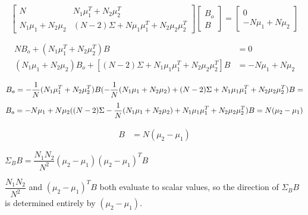 \documentclass[12pt]{report}
\begin{document}
\begin{equation}
    \begin{bmatrix}
        N & N_1 \mu_1^T + N_2 \mu_2^T  \\
        N_1 \mu_1 + N_2 \mu_2 & (N-2) \Sigma + N \mu_1 \mu_1^T + N_2 \mu_2 \mu_2^T
    \end{bmatrix}
    \begin{bmatrix}
        B_o \\
        B
    \end{bmatrix} = \begin{bmatrix}
        0 \\
        -N\mu_1 + N \mu_2
    \end{bmatrix}
\end{equation}

\begin{align}
N B_o + (N_1\mu_1^T+N_2 \mu_2^T)B &= 0 \\
(N_1 \mu_1 + N_2 \mu_2) B_o+ [(N-2) \Sigma + N_1 \mu_1\mu_1^T + N_2 \mu_2 \mu_2^T]B &= -N \mu_1 + N \mu_2
\end{align}


\begin{equation}
B_o = -\dfrac{1}{N} (N_1\mu_1^T+N_2 \mu_2^T)B \\
(-\dfrac{1}{N}(N_1 \mu_1 + N_2 \mu_2)+(N-2) \Sigma + N_1 \mu_1 \mu_1^T + N_2 \mu_2 \mu_2^T) B =
\end{equation}
\begin{equation}
B_o = -N\mu_1 + N \mu_2 \\
((N-2) \Sigma -\dfrac{1}{N}(N_1 \mu_1 + N_2 \mu_2)+ N_1 \mu_1 \mu_1^T + N_2 \mu_2 \mu_2^T) B = N(\mu_2 - \mu_1)
\end{equation}


\begin{align}
[(N-2)\Sigma + (N_1 N_2)/N \Sigma_B]B &= N(\mu_2 - \mu_1)
\end{align}



\hspace{3mm}


$\Sigma_B B = \dfrac{N_1N_2}{N^2}(\mu_2-\mu_1)(\mu_2-\mu_1)^TB$

$\dfrac{N_1N_2}{N^2}$ and $(\mu_2-\mu_1)^TB$ both evaluate to scalar values, so the direction of $\Sigma _B B$ is determined entirely by $(\mu_2-\mu_1)$.

\hspace{3mm}
\end{document}
